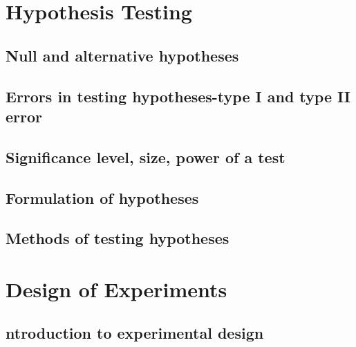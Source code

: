\documentclass[]{book}
\begin{document}
\hypertarget{hypothesis-testing}{%
\chapter{Hypothesis Testing}\label{hypothesis-testing}}

\hypertarget{null-and-alternative-hypotheses}{%
\section{Null and alternative hypotheses}\label{null-and-alternative-hypotheses}}

\hypertarget{errors-in-testing-hypotheses-type-i-and-type-ii-error}{%
\section{Errors in testing hypotheses-type I and type II error}\label{errors-in-testing-hypotheses-type-i-and-type-ii-error}}

\hypertarget{significance-level-size-power-of-a-test}{%
\section{Significance level, size, power of a test}\label{significance-level-size-power-of-a-test}}

\hypertarget{formulation-of-hypotheses}{%
\section{Formulation of hypotheses}\label{formulation-of-hypotheses}}

\hypertarget{methods-of-testing-hypotheses}{%
\section{Methods of testing hypotheses}\label{methods-of-testing-hypotheses}}

\hypertarget{design-of-experiments}{%
\chapter{Design of Experiments}\label{design-of-experiments}}

\hypertarget{ntroduction-to-experimental-design}{%
\section{ntroduction to experimental design}\label{ntroduction-to-experimental-design}}
\end{document}
